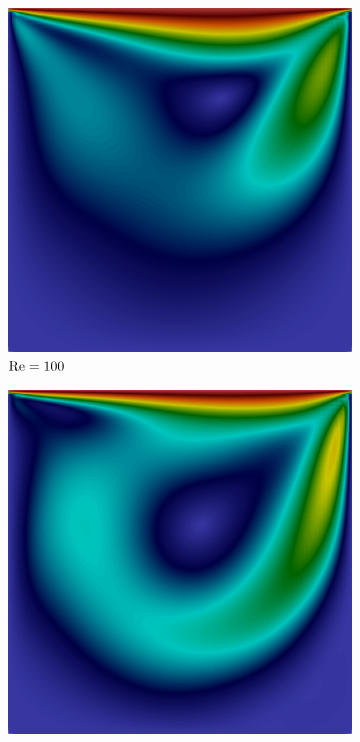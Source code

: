 \begin{figure}[h!]
    \centering
    \caption{Cavidade bidimensional - Campo de velocidades em regime estacionário.}
    \begin{subfigure}{0.32\textwidth}
        \includegraphics[width=\linewidth]{Figuras/Cavity/Re100.png}
        \caption{$\mathrm{Re}=100$}
    \end{subfigure}
    \begin{subfigure}{0.32\textwidth}
        \includegraphics[width=\linewidth]{Figuras/Cavity/Re400.png}

\end{subfigure}
\end{figure}
